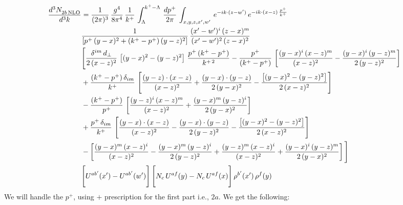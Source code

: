 \documentclass[9pt]{article}
\numberwithin{equation}{section}
\begin{document}
\begin{align}
 \frac{d^{3}N_{2b\,\rm NLO}^{\rm}}{d^{3}k}  & =   \frac{1}{(2\pi)^{3}}\,\frac{g^{4}}{8\pi^{4}}\,\frac{1}{k^{+}}\,\int_{\Lambda}^{k^{+}-\Lambda}\, \frac{dp^{+}}{2\pi} \, \int_{x,y,z,x',w'}\,e^{-ik\cdot(z-w')}\,e^{-ik\cdot (x-z)\,\frac{p^{+}}{k^{+}}}\,\notag \\ & \frac{1}{\left[p^{+}\,(y-x)^{2}+(k^{+}-p^{+})\,(y-z)^{2}\right]}\, \frac{(x'-w')^{i}\,(z-x)^{m}}{(x'-w')^{2}\,(z-x)^{2}} \notag \\ & \Bigg[\frac{\delta^{im}\,d_{\perp}}{2\,(x-z)^{2}}\,\left[(y-x)^{2}-(y-z)^{2}\right]\,\frac{p^{+}\,(k^{+}-p^{+})}{k^{+\,2}}-\frac{p^{+}}{(k^{+}-p^{+})}\,\left[\frac{(y-x)^{i}\,(x-z)^{m}}{(x-z)^{2}}-\frac{(y-x)^{i}\,(y-z)^{m}}{2\,(y-z)^{2}}\right]\notag \\ & +\frac{(k^{+}-p^{+})\,\delta_{im}}{k^{+}}\,\left[\frac{(y-z)\cdot (x-z)}{(x-z)^{2}}+\frac{(y-x)\cdot (y-z)}{2\,(y-x)^{2}}-\frac{\left[(y-x)^{2}-(y-z)^{2}\right]}{2\,(x-z)^{2}}\right]\notag \\ & -\frac{(k^{+}-p^{+})}{p^{+}}\,\left[\frac{(y-z)^{i}\,(x-z)^{m}}{(x-z)^{2}}+\frac{(y-x)^{m}\,(y-z)^{i}}{2\,(y-x)^{2}}\right]\notag \\ & +\frac{p^{+}\,\delta_{im}}{k^{+}}\,\left[\frac{(y-x)\cdot (x-z)}{(x-z)^{2}}-\frac{(y-x)\cdot (y-z)}{2\,(y-z)^{2}}-\frac{\left[(y-x)^{2}-(y-z)^{2}\right]}{2\,(x-z)^{2}}\right]\notag \\ &-\left[\frac{(y-x)^{m}\,(x-z)^{i}}{(x-z)^{2}}-\frac{(y-x)^{m}\,(y-z)^{i}}{2\,(y-z)^{2}}+\frac{(y-z)^{m}\,(x-z)^{i}}{(x-z)^{2}}+\frac{(y-x)^{i}\,(y-z)^{m}}{2\,(y-x)^{2}}\right]\Bigg] \notag \\ & \Bigg[U^{ab'}(x')-U^{ab'}(w')\Bigg]\,\Bigg[N_{c}\,U^{af}(y) -N_{c}\,U^{af}(x)\Bigg]\,\rho^{b'}(x')\,\rho^{f}(y)
\end{align}
We will handle the $p^{+}$, using $+$ prescription for the first part i.e., $2a$. We get the following: 
\end{document}
